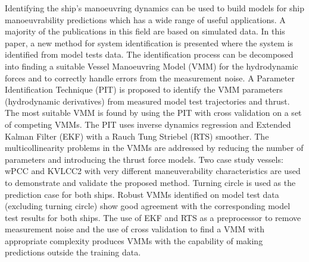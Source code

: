 Identifying the ship's manoeuvring dynamics can be used to build models for ship manoeuvrability predictions which has a wide range of useful applications. A majority of the publications in this field are based on simulated data. In this paper, a new method for system identification is presented where the system is identified from model tests data.
The identification process can be decomposed into finding a suitable Vessel Manoeuvring Model (VMM) for the hydrodynamic forces and to correctly handle errors from the measurement noise. 
A Parameter Identification Technique (PIT) is proposed to identify  the VMM parameters (hydrodynamic derivatives) from measured model test trajectories and thrust. The most suitable VMM is found by using the PIT with cross validation on a set of competing VMMs.
The PIT uses inverse dynamics regression and Extended Kalman Filter (EKF) with a Rauch Tung Striebel (RTS) smoother. The multicollinearity problems in the VMMs are addressed by reducing the number of parameters and introducing the thrust force models. Two case study vessels: wPCC and KVLCC2 with very different maneuverability characteristics are used to demonstrate and validate the proposed method. 
Turning circle is used as the prediction case for both ships. Robust VMMs identified on model test data (excluding turning circle) show good agreement with the corresponding model test results for both ships. 
The use of EKF and RTS as a preprocessor to remove measurement noise and the use of cross validation to find a VMM with appropriate complexity produces VMMs with the capability of making predictions outside the training data.  
